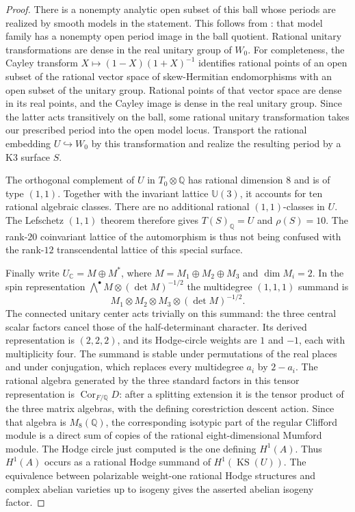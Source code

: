 \documentclass[11pt]{article}
\theoremstyle{definition}
\theoremstyle{remark}
\begin{document}
\begin{proof}
There is a nonempty analytic open subset of this ball whose periods
are realized by smooth models in the statement.
This follows from
\cite[Proposition~4.7 and Corollary~5.3]{clifford-AS}: that model family
has a nonempty open period image in the ball quotient.
Rational unitary transformations are dense in the real unitary
group of $W_0$.
For completeness, the Cayley transform
$X\mapsto(1-X)(1+X)^{-1}$ identifies rational points of an open
subset of the rational vector space of skew-Hermitian
endomorphisms with an open subset of the unitary group.
Rational points of that vector space are dense in its real points,
and the Cayley image is dense in the real unitary group.
Since the latter acts transitively on the ball, some rational
unitary transformation takes our prescribed period into the
open model locus.
Transport the rational embedding $U\hookrightarrow W_0$ by this
transformation and realize the resulting period by a K3 surface $S$.

The orthogonal complement of $U$ in $T_0\otimes\mathbb Q$ has
rational dimension $8$ and is of type $(1,1)$.
Together with the invariant lattice $\mathbb U(3)$, it accounts
for ten rational algebraic classes.
There are no additional rational $(1,1)$-classes in $U$.
The Lefschetz $(1,1)$ theorem therefore gives
$T(S)_{\mathbb Q}=U$ and $\rho(S)=10$.
The rank-$20$ coinvariant lattice of the automorphism is thus
not being confused with the rank-$12$ transcendental lattice
of this special surface.

Finally write
$U_{\mathbb C}=M\oplus M^*$, where
$M=M_1\oplus M_2\oplus M_3$ and $\dim M_i=2$.
In the spin representation
$\bigwedge^\bullet M\otimes(\det M)^{-1/2}$ the multidegree
$(1,1,1)$ summand is
\[
 M_1\otimes M_2\otimes M_3\otimes(\det M)^{-1/2}.
\]
The connected unitary center acts trivially on this summand:
the three central scalar factors cancel those of the
half-determinant character.
Its derived representation is $(2,2,2)$, and its Hodge-circle
weights are $1$ and $-1$, each with multiplicity four.
The summand is stable under permutations of the real places
and under conjugation, which replaces every multidegree
$a_i$ by $2-a_i$.
The rational algebra generated by the three standard factors
in this tensor representation is
$\operatorname{Cor}_{F/\mathbb Q}D$: after a splitting extension
it is the tensor product of the three matrix algebras, with
the defining corestriction descent action.
Since that algebra is $M_8(\mathbb Q)$, the corresponding
isotypic part of the regular Clifford module is a direct sum
of copies of the rational eight-dimensional Mumford module.
The Hodge circle just computed is the one defining $H^1(A)$.
Thus $H^1(A)$ occurs as a rational Hodge summand of
$H^1(\operatorname{KS}(U))$.
The equivalence between polarizable weight-one rational Hodge
structures and complex abelian varieties up to isogeny gives
the asserted abelian isogeny factor.
\end{proof}
\end{document}
